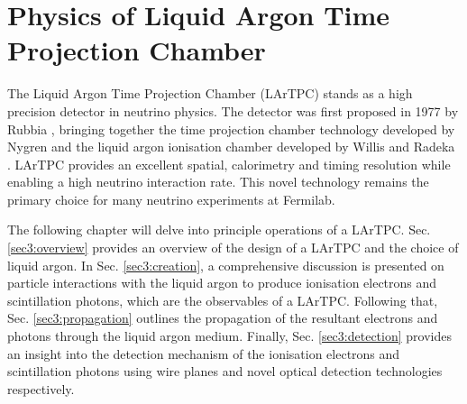 \chapter{Physics of Liquid Argon Time Projection Chamber}

\ifpdf
    \graphicspath{{Chapter3/Figs/Raster/}{Chapter3/Figs/PDF/}{Chapter3/Figs/}}
\else
    \graphicspath{{Chapter3/Figs/Vector/}{Chapter3/Figs/}}
\fi


The Liquid Argon Time Projection Chamber (LArTPC) stands as a high precision detector in neutrino physics.
The detector was first proposed in 1977 by Rubbia \cite{Rubbia}, bringing together the time projection chamber technology developed by Nygren \cite{Nygren1, Nygren2} and the liquid argon ionisation chamber developed by Willis and Radeka \cite{WillisRadeka}.
LArTPC provides an excellent spatial, calorimetry and timing resolution while enabling a high neutrino interaction rate.
This novel technology remains the primary choice for many neutrino experiments at Fermilab.

The following chapter will delve into principle operations of a LArTPC.
Sec. \ref{sec3:overview} provides an overview of the design of a LArTPC and the choice of liquid argon.
In Sec. \ref{sec3:creation}, a comprehensive discussion is presented on particle interactions with the liquid argon to produce ionisation electrons and scintillation photons, which are the observables of a LArTPC.
Following that, Sec. \ref{sec3:propagation} outlines the propagation of the resultant electrons and photons through the liquid argon medium.
Finally, Sec. \ref{sec3:detection} provides an insight into the detection mechanism of the ionisation electrons and scintillation photons using wire planes and novel optical detection technologies respectively.

\newpage

